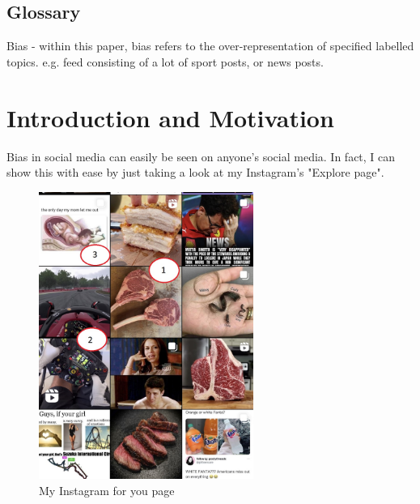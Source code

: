 \documentclass[a4paper,fleqn,10pt]{article}
\begin{document}


\pagestyle{plain}

\subsection{Glossary}
Bias - within this paper, bias refers to the over-representation of specified labelled topics. e.g. feed consisting of a lot of sport
posts, or news posts.

\section{Introduction and Motivation}
\label{sec:intro}


Bias in social media can easily be seen on anyone's social media. In fact, I can show this with ease by just taking a look at my
Instagram's "Explore page".
\begin{figure}[htbp]
    \centering
    \includegraphics[width=70mm]{../images/ig4u.jpg}
    \caption{My Instagram for you page}
    \label{fig:ig4u}
\end{figure}
\end{document}
